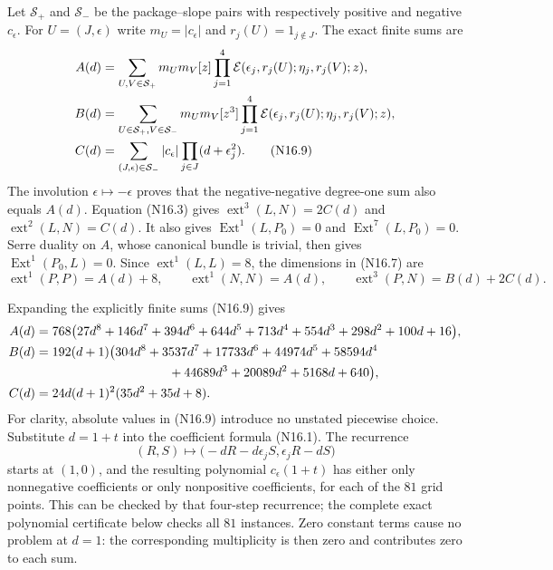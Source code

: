 Let $\mathcal S_+$ and $\mathcal S_-$ be the package--slope pairs
with respectively positive and negative $c_\epsilon$. For
$U=(J,\epsilon)$ write $m_U=|c_\epsilon|$ and
$r_j(U)=1_{j\notin J}$. The exact finite sums are
\begin{align}
 A(d)&=\sum_{U,V\in\mathcal S_+}m_Um_V[z]
       \prod_{j=1}^4\mathcal E(\epsilon_j,r_j(U);
                                      \eta_j,r_j(V);z),\notag\\
 B(d)&=\sum_{U\in\mathcal S_+,V\in\mathcal S_-}m_Um_V[z^3]
       \prod_{j=1}^4\mathcal E(\epsilon_j,r_j(U);
                                      \eta_j,r_j(V);z),\notag\\
 C(d)&=\sum_{(J,\epsilon)\in\mathcal S_-}
                      |c_\epsilon|\prod_{j\in J}(d+\epsilon_j^2).
                                                        \tag{N16.9}
\end{align}
The involution $\epsilon\mapsto-\epsilon$ proves that the
negative-negative degree-one sum also equals $A(d)$.
Equation (N16.3) gives
$\operatorname{ext}^3(L,N)=2C(d)$ and
$\operatorname{ext}^2(L,N)=C(d)$.
It also gives $\operatorname{Ext}^1(L,P_0)=0$ and
$\operatorname{Ext}^7(L,P_0)=0$. Serre duality on $A$, whose
canonical bundle is trivial, then gives
$\operatorname{Ext}^1(P_0,L)=0$. Since
$\operatorname{ext}^1(L,L)=8$, the dimensions in (N16.7) are
\begin{equation}
 \operatorname{ext}^1(P,P)=A(d)+8,\qquad
 \operatorname{ext}^1(N,N)=A(d),\qquad
 \operatorname{ext}^3(P,N)=B(d)+2C(d).                 \tag{N16.10}
\end{equation}

Expanding the explicitly finite sums (N16.9) gives
\begin{align*}
 A(d)&=768\bigl(27d^8+146d^7+394d^6+644d^5+713d^4
                   +554d^3+298d^2+100d+16\bigr),\\
 B(d)&=192(d+1)\bigl(304d^8+3537d^7+17733d^6+44974d^5
                   +58594d^4\\
     &\hspace{37mm}{}+44689d^3+20089d^2+5168d+640\bigr),\\
 C(d)&=24d(d+1)^2(35d^2+35d+8).
\end{align*}
For clarity, absolute values in (N16.9) introduce no unstated
piecewise choice. Substitute $d=1+t$ into the coefficient formula
(N16.1). The recurrence
\[
 (R,S)\longmapsto\bigl(-dR-d\epsilon_jS,
                                      \epsilon_jR-dS\bigr)
\]
starts at $(1,0)$, and the resulting polynomial $c_\epsilon(1+t)$
has either only nonnegative coefficients or only nonpositive
coefficients, for each of the $81$ grid points. This can be
checked by that four-step recurrence; the complete exact
polynomial certificate below checks all $81$ instances.
Zero constant terms cause no problem at $d=1$: the corresponding
multiplicity is then zero and contributes zero to each sum.

